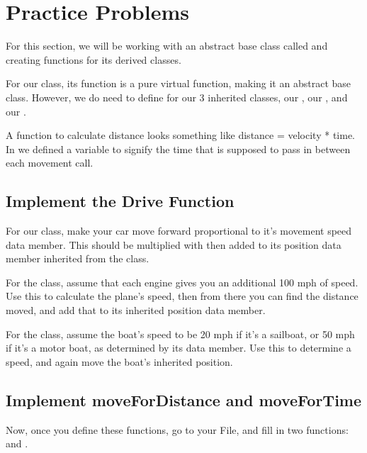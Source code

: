 \documentclass{tufte-handout}
\begin{document}
\section{Practice Problems}
For this section, we will be working with an abstract base class called  and creating functions for its derived classes.

For our  class, its  function is a pure virtual function, making it an abstract base class.
However, we do need to define  for our 3 inherited classes, our , our , and our .

A function to calculate distance looks something like distance = velocity * time. In  we defined a  variable to signify the time that is supposed to pass in between each movement call.

\subsection{Implement the Drive Function}
For our  class, make your car move forward proportional to it's movement speed data member.
This should be multiplied with  then added to its position data member inherited from the  class. \newline \medskip

For the  class, assume that each engine gives you an additional 100 mph of speed.
Use this to calculate the plane's speed, then from there you can find the distance moved, and add that to its inherited position data member. \newline \medskip

For the  class, assume the boat's speed to be 20 mph if it's a sailboat, or 50 mph if it's a motor boat, as determined by its  data member.
Use this to determine a speed, and again move the boat's inherited position.

\subsection{Implement moveForDistance and moveForTime}
Now, once you define these functions, go to your  File, and fill in two functions:
 and . \newline \medskip
\end{document}
